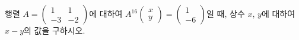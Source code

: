 행렬 $A=\begin{pmatrix} 1 & 1 \\ -3 & -2 \end{pmatrix}$에 대하여 $A^{16}\begin{pmatrix} x \\ y \end{pmatrix}=\begin{pmatrix} 1 \\ -6 \end{pmatrix}$일 때, 상수 $x$, $y$에 대하여 $x-y$의 값을 구하시오.
